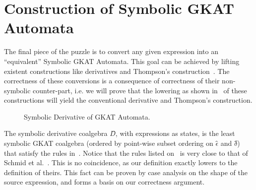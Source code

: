 \documentclass[conference]{IEEEtran}
\newcommand\altxrightarrow[2][0pt]{\mathrel{\ensurestackMath{\stackengine%
  {\dimexpr#1-7.5pt}{\xrightarrow{\phantom{#2}}}{\scriptstyle\!#2\,}%
  {O}{c}{F}{F}{S}}}}
\newcommand{\transvia}[1]{
    \mathrel{\raisebox{-2px}{\(\altxrightarrow[-2px]{#1}\)}}
}
\newcommand{\transAcc}[2]{⇒_{#1} #2}
\begin{document}
\section{Construction of Symbolic GKAT Automata}

The final piece of the puzzle is to convert any given expression into an ``equivalent'' Symbolic GKAT Automata. This goal can be achieved by lifting existent constructions like derivatives and Thompson's construction~\cite{schmid_GuardedKleeneAlgebra_2021,smolka_GuardedKleeneAlgebra_2020}.
The correctness of these conversions is a consequence of  correctness of their non-symbolic counter-part, i.e. we will prove that the lowering as shown in~ of these constructions will yield the conventional derivative and Thompson's construction. 

\begin{figure*}
    \caption{Symbolic Derivative of GKAT Automata.}\label{fig:derivatives-rules}
\end{figure*}

The symbolic derivative coalgebra \(D̂\), with expressions as states, is the least symbolic GKAT coalgebra (ordered by point-wise subset ordering on \(ϵ̂\) and \(δ̂\)) that satisfy the rules in~.
Notice that the rules listed on~ is very close to that of Schmid et al.~\cite{schmid_GuardedKleeneAlgebra_2021}.
This is no coincidence, as our definition exactly lowers to the definition of theirs.
This fact can be proven by case analysis on the shape of the source expression, and forms a basis on our correctness argument.
\end{document}
